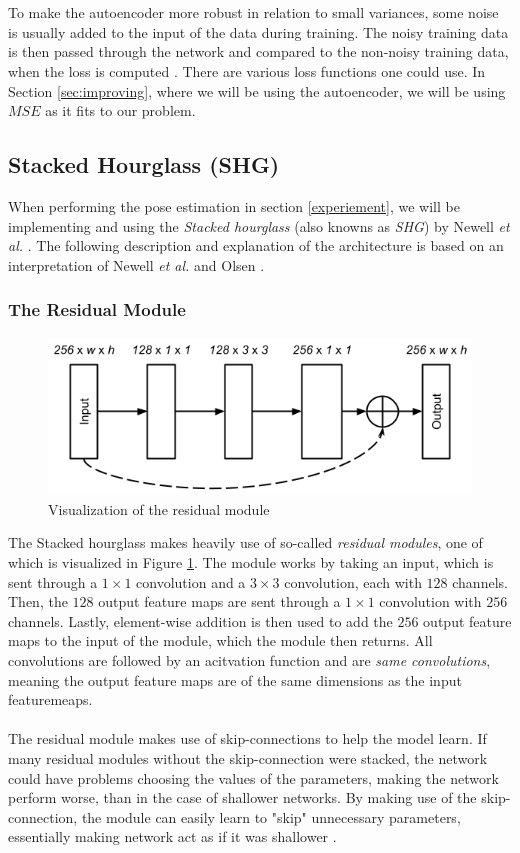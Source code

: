 \documentclass[./main.tex]{subfiles}
\begin{document}
\\
\\
To make the autoencoder more robust in relation to small variances, some noise is usually added to the input of the data during training. The noisy training data is then passed through the network and compared to the non-noisy training data, when the loss is computed \cite{DeepLearning}. There are various loss functions one could use. In Section \ref{sec:improving}, where we will be using the autoencoder, we will be using $MSE$ as it fits to our problem.

\subsection{Stacked Hourglass (SHG)}\label{subsec:SHG}
When performing the pose estimation in section \ref{experiement}, we will be implementing and using the \textit{Stacked hourglass} (also knowns as \textit{SHG}) by Newell \textit{et al.} \cite{Newell}. The following description and explanation of the architecture is based on an interpretation of Newell \textit{et al.} \cite{Newell} and Olsen \cite{Camilla}.

\subsubsection{The Residual Module}
\begin{figure}[htbp]
    \centering
    \includegraphics[height = 3 cm]{entities/Residual.png}
    \caption{Visualization of the residual module \cite{Newell}}
    \label{fig:residual}
\end{figure}
\noindent The Stacked hourglass makes heavily use of so-called \textit{residual modules}, one of which is visualized in Figure \ref{fig:residual}. The module works by taking an input, which is sent through a $1 \times 1$ convolution and a $3 \times 3$ convolution, each with $128$ channels. Then, the $128$ output feature maps are sent through a $1 \times 1$ convolution with $256$ channels. Lastly, element-wise addition is then used to add the $256$ output feature maps to the input of the module, which the module then returns. All convolutions are followed by an acitvation function and are \textit{same convolutions}, meaning the output feature maps are of the same dimensions as the input featuremeaps.
\\
\\
\noindent The residual module makes use of skip-connections to help the model learn. If many residual modules without the skip-connection were stacked, the network could have problems choosing the values of the parameters, making the network perform worse, than in the case of shallower networks. By making use of the skip-connection, the module can easily learn to "skip" unnecessary parameters, essentially making network act as if it was shallower \cite{ResNet}.
\end{document}
